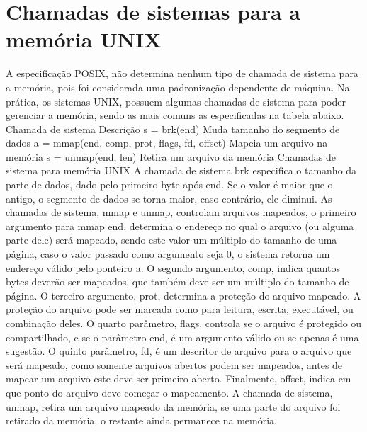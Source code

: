 \section{Chamadas de sistemas para a memória UNIX}
A especificação POSIX, não determina nenhum tipo de chamada de sistema para a memória, pois foi considerada uma padronização dependente de máquina. Na prática, os sistemas UNIX, possuem algumas chamadas de sistema para poder gerenciar a memória, sendo as mais comuns as especificadas na tabela abaixo.
Chamada de sistema
Descrição
s = brk(end)
Muda tamanho do segmento de dados
a = mmap(end, comp, prot, flags, fd, offset)
Mapeia um arquivo na memória
s = unmap(end, len)
Retira um arquivo da memória
Chamadas de sistema para memória UNIX
A chamada de sistema brk especifica o tamanho da parte de dados, dado pelo primeiro byte após end. Se o valor é maior que o antigo, o segmento de dados se torna maior, caso contrário, ele diminui.
As chamadas de sistema, mmap e unmap, controlam arquivos mapeados, o primeiro argumento para mmap end, determina o endereço no qual o arquivo (ou alguma parte dele) será mapeado, sendo este valor um múltiplo do tamanho de uma página, caso o valor passado como argumento seja 0, o sistema retorna um endereço válido pelo ponteiro a. O segundo argumento, comp, indica quantos bytes deverão ser mapeados, que também deve ser um múltiplo do tamanho de página. O terceiro argumento, prot, determina a proteção do arquivo mapeado. A proteção do arquivo pode ser marcada como para leitura, escrita, executável, ou combinação deles. O quarto parâmetro, flags, controla se o arquivo é protegido ou compartilhado, e se o parâmetro end, é um argumento válido ou se apenas é uma sugestão. O quinto parâmetro, fd, é um descritor de arquivo para o arquivo que será mapeado, como somente arquivos abertos podem ser mapeados, antes de mapear um arquivo este deve ser primeiro aberto. Finalmente, offset, indica em que ponto do arquivo deve começar o mapeamento.
A chamada de sistema, unmap, retira um arquivo mapeado da memória, se uma parte do arquivo foi retirado da memória, o restante ainda permanece na memória.
